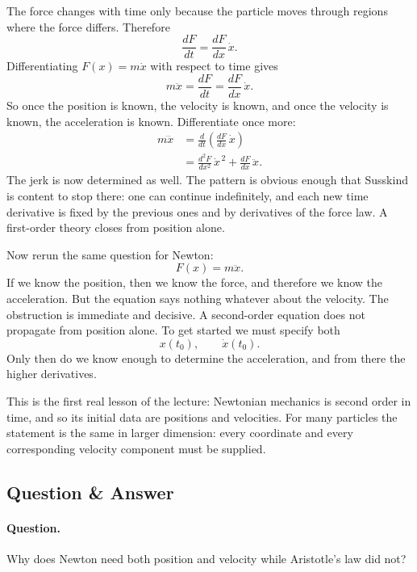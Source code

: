 The force changes with time only because the particle moves through regions where the force differs. Therefore
\begin{equation}
\frac{dF}{dt}=\frac{dF}{dx}\,\dot x.
\end{equation}
Differentiating \(F(x)=m\dot x\) with respect to time gives
\begin{equation}
m\ddot x = \frac{dF}{dt}=\frac{dF}{dx}\,\dot x.
\end{equation}
So once the position is known, the velocity is known, and once the velocity is known, the acceleration is known. Differentiate once more:
\begin{align}
m\dddot x
&=
\frac{d}{dt}\!\left(\frac{dF}{dx}\,\dot x\right) \\
&=
\frac{d^2F}{dx^2}\,\dot x^{\,2}
+
\frac{dF}{dx}\,\ddot x.
\end{align}
The jerk is now determined as well. The pattern is obvious enough that Susskind is content to stop there: one can continue indefinitely, and each new time derivative is fixed by the previous ones and by derivatives of the force law. A first-order theory closes from position alone.

Now rerun the same question for Newton:
\begin{equation}
F(x)=m\ddot x.
\end{equation}
If we know the position, then we know the force, and therefore we know the acceleration. But the equation says nothing whatever about the velocity. The obstruction is immediate and decisive. A second-order equation does not propagate from position alone. To get started we must specify both
\begin{equation}
x(t_0),
\qquad
\dot x(t_0).
\end{equation}
Only then do we know enough to determine the acceleration, and from there the higher derivatives.

This is the first real lesson of the lecture: Newtonian mechanics is second order in time, and so its initial data are positions and velocities. For many particles the statement is the same in larger dimension: every coordinate and every corresponding velocity component must be supplied.

\subsection{Question \& Answer}

\paragraph{Question.} Why does Newton need both position and velocity while Aristotle's law did not?

